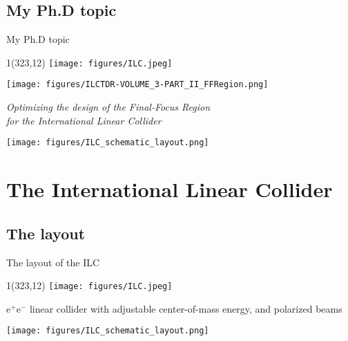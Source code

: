 \documentclass[xcolor={dvipsnames}]{beamer}
\newcommand{\ilclogo}{
  \setlength{\TPHorizModule}{1pt}
  \setlength{\TPVertModule}{1pt}
  \begin{textblock}{1}(323,12)
   \texttt{[image: figures/ILC.jpeg]}
  \end{textblock}
}
\begin{document}
\subsection{My Ph.D topic}
\begin{frame}{My Ph.D topic}
\ilclogo
\begin{center}
\texttt{[image: figures/ILCTDR-VOLUME\_3-PART\_II\_FFRegion.png]}
\begin{block}{}
\centering
\textit{Optimizing the design of the Final-Focus Region\\for the International Linear Collider}
\end{block}
\texttt{[image: figures/ILC\_schematic\_layout.png]}
\end{center}
\end{frame}

\section{The International Linear Collider}

\subsection{The layout}
\begin{frame}{The layout of the ILC}
\ilclogo

e$^+$e$^-$ linear collider with adjustable center-of-mass energy, and polarized beams\\
\begin{center}
\texttt{[image: figures/ILC\_schematic\_layout.png]}
\end{center}
\begin{flushright}
 \href{https://www.youtube.com/watch?v=ep5496vdEFI}{}
\end{flushright}

\end{frame}
\end{document}
